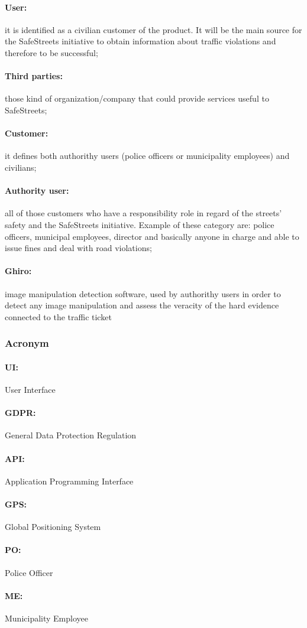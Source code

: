\documentclass{article}
\begin{document}
\paragraph{User:} it is identified as a civilian customer of the product. It
will be the main source for the SafeStreets initiative to obtain information
about traffic violations and therefore to be successful; \paragraph{Third
parties:}those kind of organization/company that could provide services useful
to SafeStreets; \paragraph{Customer:} it defines both authorithy users (police
officers or municipality employees) and civilians; \paragraph{Authority
user:}all of those customers who have a responsibility role in regard of the
streets' safety and the SafeStreets initiative. Example of these category are:
police officers, municipal employees, director and basically anyone in charge
and able to issue fines and deal with road violations; \paragraph{Ghiro:} image
manipulation detection software, used by authorithy users in order to detect any
image manipulation and assess the veracity of the hard evidence connected to the
traffic ticket
\subsubsection{Acronym}
\paragraph{UI:} User Interface \paragraph{GDPR:} General Data Protection
Regulation \paragraph{API:} Application Programming Interface \paragraph{GPS:}
Global Positioning System \paragraph{PO:} Police Officer \paragraph{ME:}
Municipality Employee
\end{document}
